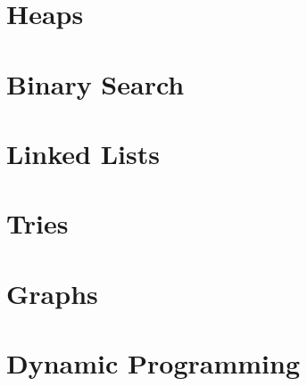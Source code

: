\section{Heaps}

\section{Binary Search}


\section{Linked Lists}

\section{Tries}

\section{Graphs}

\section{Dynamic Programming}
